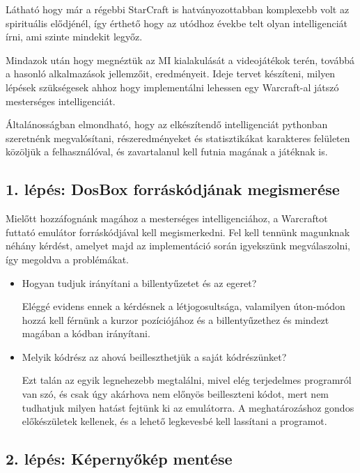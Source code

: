 Látható hogy már a régebbi StarCraft is hatványozottabban komplexebb volt az spirituális elődjénél, így érthető hogy az utódhoz évekbe telt olyan intelligenciát írni, ami szinte mindekit legyőz.


Mindazok után hogy megnéztük az MI kialakulását a videojátékok terén, továbbá a hasonló alkalmazások jellemzőit, eredményeit. Ideje tervet készíteni, milyen lépések szükségesek ahhoz hogy implementálni lehessen egy Warcraft-al játszó mesterséges intelligenciát.

Általánosságban elmondható, hogy az elkészítendő intelligenciát pythonban szeretnénk megvalósítani, részeredményeket és statisztikákat karakteres felületen közöljük a felhasználóval, és zavartalanul kell futnia magának a játéknak is.

\subsection{1. lépés: DosBox forráskódjának megismerése}

Mielőtt hozzáfognánk magához a mesterséges intelligenciához, a Warcraftot futtató emulátor forráskódjával kell megismerkedni. Fel kell tennünk magunknak néhány kérdést, amelyet majd az implementáció során igyekszünk megválaszolni, így megoldva a problémákat.

\begin{itemize}
    \item Hogyan tudjuk irányítani a billentyűzetet és az egeret?
    
    Eléggé evidens ennek a kérdésnek a létjogosultsága, valamilyen úton-módon hozzá kell férnünk a kurzor pozíciójához és a billentyűzethez és mindezt magában a kódban irányítani.  
    \item Melyik kódrész az ahová beilleszthetjük a saját kódrészünket?
    
    Ezt talán az egyik legnehezebb megtalálni, mivel elég terjedelmes programról van szó, és csak úgy akárhova nem előnyös beilleszteni kódot, mert nem tudhatjuk milyen hatást fejtünk ki az emulátorra. A meghatározáshoz gondos előkészületek kellenek, és a lehető legkevesbé kell lassítani a programot.
\end{itemize}

\subsection{2. lépés: Képernyőkép mentése}

